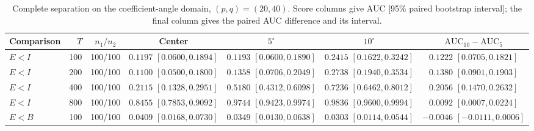 \documentclass[12pt,letterpaper]{article}
\def\spacingset#1{\renewcommand{\baselinestretch}{#1}\small\normalsize}
\theoremstyle{plain}
\theoremstyle{definition}
\begin{document}
\begin{table}[p]
\begingroup
\spacingset{1.0}
\small\centering
\caption{Complete separation on the coefficient-angle domain, $(p,q)=(20,40)$. Score columns give AUC [95\% paired bootstrap interval]; the final column gives the paired AUC difference and its interval.}
\label{s23:lambda:allauc:p20q40}
\footnotesize
\setlength{\tabcolsep}{3.5pt}
\renewcommand{\arraystretch}{1.10}
\begin{adjustbox}{max width=\linewidth}
\begin{tabular}{lrccccc}
\toprule
Comparison & $T$ & $n_1/n_2$ & Center & $5^\circ$ & $10^\circ$ & $\mathrm{AUC}_{10}-\mathrm{AUC}_{5}$\\
\midrule
$E<I$ & 100 & 100/100 & \shortstack{$0.1197$\\{\scriptsize$[0.0600,0.1894]$}} & \shortstack{$0.1193$\\{\scriptsize$[0.0600,0.1890]$}} & \shortstack{$0.2415$\\{\scriptsize$[0.1622,0.3242]$}} & \shortstack{$0.1222$\\{\scriptsize$[0.0705,0.1821]$}}\\
$E<I$ & 200 & 100/100 & \shortstack{$0.1100$\\{\scriptsize$[0.0500,0.1800]$}} & \shortstack{$0.1358$\\{\scriptsize$[0.0706,0.2049]$}} & \shortstack{$0.2738$\\{\scriptsize$[0.1940,0.3534]$}} & \shortstack{$0.1380$\\{\scriptsize$[0.0901,0.1903]$}}\\
$E<I$ & 400 & 100/100 & \shortstack{$0.2115$\\{\scriptsize$[0.1328,0.2951]$}} & \shortstack{$0.5180$\\{\scriptsize$[0.4312,0.6098]$}} & \shortstack{$0.7236$\\{\scriptsize$[0.6462,0.8012]$}} & \shortstack{$0.2056$\\{\scriptsize$[0.1470,0.2632]$}}\\
$E<I$ & 800 & 100/100 & \shortstack{$0.8455$\\{\scriptsize$[0.7853,0.9092]$}} & \shortstack{$0.9744$\\{\scriptsize$[0.9423,0.9974]$}} & \shortstack{$0.9836$\\{\scriptsize$[0.9600,0.9994]$}} & \shortstack{$0.0092$\\{\scriptsize$[0.0007,0.0224]$}}\\
\addlinespace
$E<B$ & 100 & 100/100 & \shortstack{$0.0409$\\{\scriptsize$[0.0168,0.0730]$}} & \shortstack{$0.0349$\\{\scriptsize$[0.0130,0.0638]$}} & \shortstack{$0.0303$\\{\scriptsize$[0.0114,0.0544]$}} & \shortstack{$-0.0046$\\{\scriptsize$[-0.0111,0.0006]$}}\\

\end{tabular}
\end{adjustbox}
\end{table}
\end{document}
